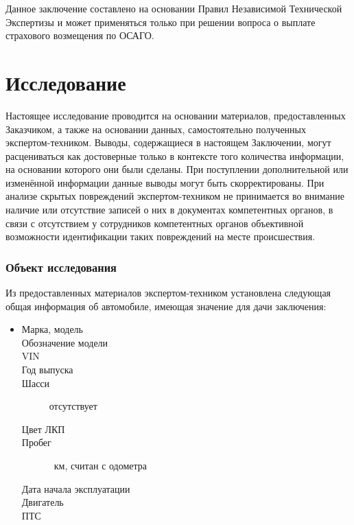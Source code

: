 Данное заключение составлено на основании Правил Независимой Технической Экспертизы и может применяться только при решении вопроса о выплате страхового возмещения по ОСАГО.


\section{Исследование}

Настоящее исследование проводится на основании материалов, предоставленных Заказчиком, а также на основании данных, самостоятельно полученных экспертом-техником. Выводы, содержащиеся в настоящем Заключении, могут расцениваться как достоверные только в контексте того количества информации, на основании которого они были сделаны. При поступлении дополнительной или изменённой информации данные выводы могут быть
скорректированы. При анализе скрытых повреждений экспертом-техником не принимается во внимание наличие или отсутствие записей о них в документах компетентных органов, в связи с отсутствием у сотрудников компетентных органов объективной возможности  идентификации таких повреждений на месте происшествия.

\subsubsection{Объект исследования}

	\par Из предоставленных материалов   экспертом-техником установлена следующая общая информация об автомобиле, имеющая значение для дачи заключения:
 \parbox[]{10cm}{}
\begin{itemize}
	\item[ ] 
	\begin{description}
		\item[Марка, модель] \hfill {}
        	\item[Обозначение модели] \hfill {}  
		\item[VIN] \hfill \vin
		\item[Год выпуска] \hfill {}
		\item[Шасси] \hfill отсутствует
		\item[Цвет ЛКП] \hfill {}
		\item[Пробег] \hfill  {}\, км, считан с одометра
		\item[Дата начала эксплуатации] \hfill {}
		\item[Двигатель] \hfill {}
		\item[ПТС] \hfill{}
	\end{description}
\end{itemize}

